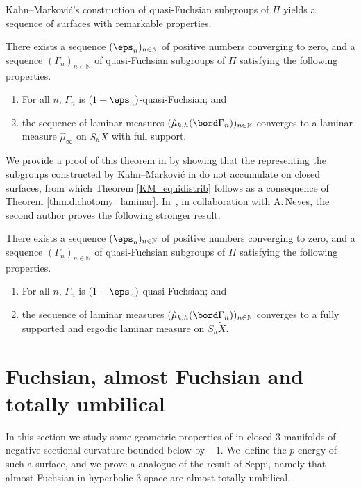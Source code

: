 Kahn--Markovi\'c's construction \cite{KM1} of quasi-Fuchsian subgroups of $\Pi$ yields a sequence of surfaces with remarkable properties.

\begin{theorem}\label{KM_equidistrib}
There exists a sequence $(\eps_n)_{n\in\mathbb{N}}$ of positive numbers converging to zero, and a sequence $(\Gamma_n)_{n\in\mathbb{N}}$ of quasi-Fuchsian subgroups of $\Pi$ satisfying the following properties.
\begin{enumerate}
\item For all $n$, $\Gamma_n$ is $(1+\eps_n)$-quasi-Fuchsian; and
\item the sequence of laminar measures $(\hat \mu_{k,h}(\bord\Gamma_n))_{n\in\mathbb{N}}$ converges to a laminar measure $\hat \mu_\infty$ on $S_h\tilde{X}$ with full support.
\end{enumerate}
\end{theorem}

We provide a proof of this theorem in \cite{ALS} by showing that the \ksurfaces representing the subgroups constructed by Kahn--Markovi\'c in \cite{KM1} do not accumulate on closed surfaces, from which Theorem \ref{KM_equidistrib} follows as a consequence of Theorem \ref{thm.dichotomy_laminar}. In~\cite[Prop.\,6.1]{ln21}, in collaboration with A.\,Neves, the second author proves the following stronger result.

\begin{theorem}\label{th.lowe_neves}
There exists a sequence $(\eps_n)_{n\in\mathbb{N}}$ of positive numbers converging to zero, and a sequence $(\Gamma_n)_{n\in\mathbb{N}}$ of quasi-Fuchsian subgroups of $\Pi$ satisfying the following properties.
\begin{enumerate}
\item For all $n$, $\Gamma_n$ is $(1+\eps_n)$-quasi-Fuchsian; and
\item the sequence of laminar measures $(\hat \mu_{k,h}(\bord\Gamma_n))_{n\in\mathbb{N}}$ converges to a fully supported and ergodic laminar measure on $S_h\tilde{X}$.
\end{enumerate}
\end{theorem}

\section{Fuchsian, almost Fuchsian and totally umbilical \texorpdfstring{\protect\ksurfaces}{ksurf}} In this section we study some geometric properties of \ksurfaces in closed $3$\nobreakdash-manifolds of negative sectional curvature bounded below by $-1$. We~define the $p$-energy of such a surface, and we prove a \ksurface analogue of the result \cite{Seppi} of Seppi, namely that almost-Fuchsian \ksurfaces in hyperbolic $3$\nobreakdash-space are almost totally umbilical.

